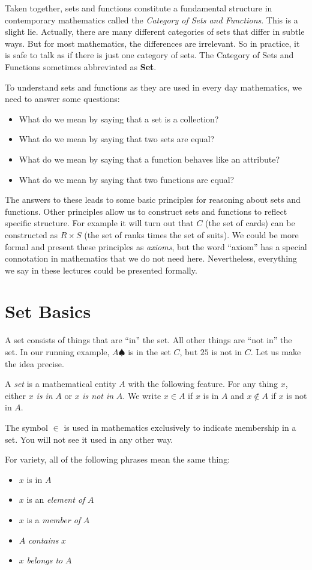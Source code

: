 Taken together, sets and functions constitute a fundamental structure in contemporary mathematics called the \emph{Category of Sets and Functions}. 
This is a slight lie.
Actually, there are many different categories of sets that differ in subtle ways. 
But for most mathematics, the differences are irrelevant.
So in practice, it is safe to talk as if there is just one category of sets.
The Category of Sets and Functions sometimes abbreviated as \textbf{Set}.

To understand sets and functions as they are used in every day mathematics, we need to answer some questions:
\begin{itemize}
	\item What do we mean by saying that a set is a collection?
	\item What do we mean by saying that two sets are equal?
	\item What do we mean by saying that a function behaves like an attribute?
	\item What do we mean by saying that two functions are equal?
\end{itemize}
The answers to these leads to some basic principles for reasoning about sets and functions. 
Other principles allow us to construct sets and functions to reflect specific
structure. For example it will turn out that $C$ (the set of cards) can be constructed as $R\times S$ (the set of ranks times the set of suits).
We could be more formal and present these principles as \emph{axioms}, but the word ``axiom''
has a special connotation in mathematics that we do not need here. Nevertheless, everything we say in these lectures could be presented formally.  

\section{Set Basics}

A set consists of things that are ``in'' the set. All other things are ``not in'' the set. In our running example, $A\spadesuit$ is in the set $C$, but $25$ is not in $C$. Let us make the idea precise.

\begin{signature}\label{sig:SetSignature}
  A \emph{set} is a mathematical entity $A$ with the following feature. 
  For any thing $x$, either $x$ \emph{is in} $A$ or $x$ \emph{is not in} $A$. 
  We write $x\in A$ if $x$ is in $A$ and $x\notin A$ if $x$ is not in $A$.

The symbol $\in$ is used in mathematics exclusively to indicate membership in a set. 
You will not see it used in any other way.  

For variety, all of the following phrases mean the same thing:
\begin{itemize}
\item $x$ is in $A$
\item $x$ is an \emph{element of} $A$
\item $x$  is a \emph{member of} $A$
\item $A$ \emph{contains} $x$
\item $x$ \emph{belongs to} $A$
\end{itemize}
\end{signature}

